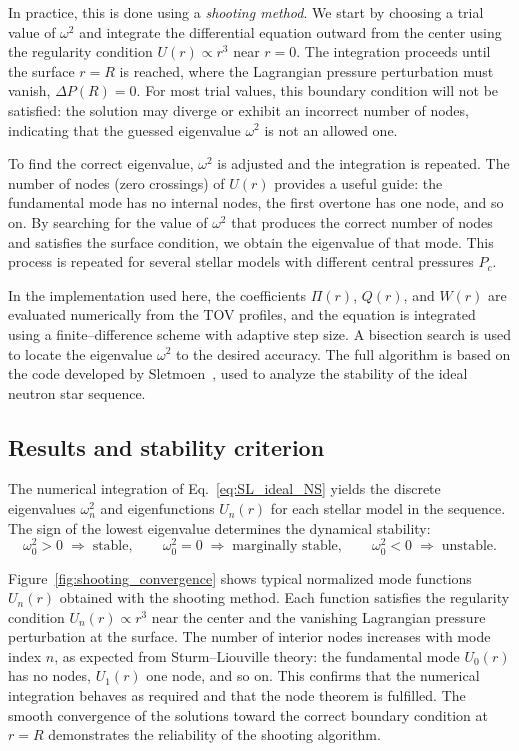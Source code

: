 In practice, this is done using a \emph{shooting method}.
We start by choosing a trial value of $\omega^2$ and integrate the
differential equation outward from the center using the regularity
condition $U(r)\propto r^3$ near $r=0$.
The integration proceeds until the surface $r=R$ is reached, where the
Lagrangian pressure perturbation must vanish, $\Delta P(R)=0$.
For most trial values, this boundary condition will not be satisfied:
the solution may diverge or exhibit an incorrect number of nodes,
indicating that the guessed eigenvalue $\omega^2$ is not an allowed one.

To find the correct eigenvalue, $\omega^2$ is adjusted and the
integration is repeated.
The number of nodes (zero crossings) of $U(r)$ provides a useful guide:
the fundamental mode has no internal nodes, the first overtone has one
node, and so on.
By searching for the value of $\omega^2$ that produces the correct
number of nodes and satisfies the surface condition, we obtain the
eigenvalue of that mode.
This process is repeated for several stellar models with different
central pressures $P_c$.

In the implementation used here, the coefficients
$\Pi(r)$, $Q(r)$, and $W(r)$ are evaluated numerically from the TOV
profiles, and the equation is integrated using a finite--difference
scheme with adaptive step size.
A bisection search is used to locate the eigenvalue $\omega^2$ to the
desired accuracy.
The full algorithm is based on the code developed by
Sletmoen~\cite{sletmoen2022}, used to analyze the stability of the ideal neutron star
sequence.

\subsection*{Results and stability criterion}

The numerical integration of Eq.~\eqref{eq:SL_ideal_NS} yields the
discrete eigenvalues $\omega_n^2$ and eigenfunctions $U_n(r)$ for each
stellar model in the sequence.
The sign of the lowest eigenvalue determines the dynamical stability:
\[
\omega_0^2 > 0 \;\Rightarrow\; \text{stable}, \qquad
\omega_0^2 = 0 \;\Rightarrow\; \text{marginally stable}, \qquad
\omega_0^2 < 0 \;\Rightarrow\; \text{unstable}.
\]

Figure~\ref{fig:shooting_convergence} shows typical normalized mode
functions $U_n(r)$ obtained with the shooting method.
Each function satisfies the regularity condition $U_n(r)\propto r^3$
near the center and the vanishing Lagrangian pressure perturbation at
the surface.
The number of interior nodes increases with mode index $n$, as expected
from Sturm--Liouville theory: the fundamental mode $U_0(r)$ has no
nodes, $U_1(r)$ one node, and so on.
This confirms that the numerical integration behaves as required and
that the node theorem is fulfilled.
The smooth convergence of the solutions toward the correct boundary
condition at $r=R$ demonstrates the reliability of the shooting
algorithm.

